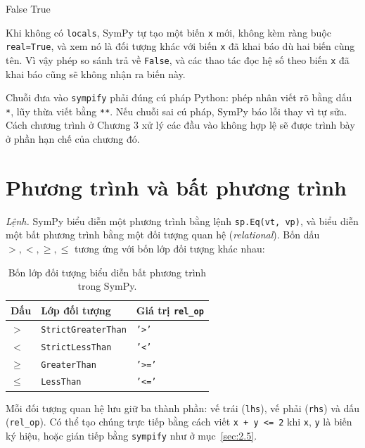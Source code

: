 \documentclass[12pt,a4paper]{report}
\begin{document}
\begin{ketquabox}
False
True
\end{ketquabox}

Khi không có \texttt{locals}, SymPy tự tạo một biến \texttt{x} mới, không kèm ràng buộc \texttt{real=True}, và xem nó là đối tượng khác với biến \texttt{x} đã khai báo dù hai biến cùng tên. Vì vậy phép so sánh trả về \texttt{False}, và các thao tác đọc hệ số theo biến \texttt{x} đã khai báo cũng sẽ không nhận ra biến này.

\begin{notebox}
Chuỗi đưa vào \texttt{sympify} phải đúng cú pháp Python: phép nhân viết rõ bằng dấu \texttt{*}, lũy thừa viết bằng \texttt{**}. Nếu chuỗi sai cú pháp, SymPy báo lỗi thay vì tự sửa. Cách chương trình ở Chương 3 xử lý các đầu vào không hợp lệ sẽ được trình bày ở phần hạn chế của chương đó.
\end{notebox}

\section{Phương trình và bất phương trình}
\label{sec:2.6}

\textit{Lệnh.} SymPy biểu diễn một phương trình bằng lệnh \texttt{sp.Eq(vt, vp)}, và biểu diễn một bất phương trình bằng một đối tượng quan hệ (\textit{relational}). Bốn dấu $>,<,\ge,\le$ tương ứng với bốn lớp đối tượng khác nhau:

\begin{table}[htbp]
\centering
\small
\begin{tabular}{@{}p{2.2cm}p{5cm}p{2.6cm}@{}}
\toprule
Dấu & Lớp đối tượng & Giá trị \texttt{rel\_op} \\
\midrule
$>$ & \texttt{StrictGreaterThan} & \texttt{'>'} \\
$<$ & \texttt{StrictLessThan} & \texttt{'<'} \\
$\ge$ & \texttt{GreaterThan} & \texttt{'>='} \\
$\le$ & \texttt{LessThan} & \texttt{'<='} \\
\bottomrule
\end{tabular}
\caption{Bốn lớp đối tượng biểu diễn bất phương trình trong SymPy.}
\label{tab:lop-relational}
\end{table}

Mỗi đối tượng quan hệ lưu giữ ba thành phần: vế trái (\texttt{lhs}), vế phải (\texttt{rhs}) và dấu (\texttt{rel\_op}). Có thể tạo chúng trực tiếp bằng cách viết \texttt{x + y <= 2} khi \texttt{x}, \texttt{y} là biến ký hiệu, hoặc gián tiếp bằng \texttt{sympify} như ở mục~\ref{sec:2.5}.
\end{document}
